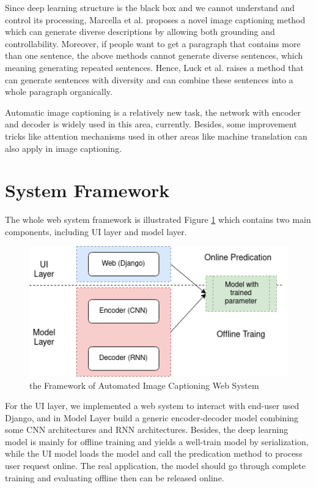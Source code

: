 \documentclass{article}
\begin{document}
Since deep learning structure is the black box and we cannot understand and control its processing, Marcella et al.\cite{cornia2019show} proposes a novel image captioning method which can generate diverse descriptions by allowing both grounding and controllability. Moreover, if people want to get a paragraph that contains more than one sentence, the above methods cannot generate diverse sentences, which meaning generating repeated sentences. Hence, Luck et al.\cite{melas2018training} raises a method that can generate sentences with diversity and can combine these sentences into a whole paragraph organically.

Automatic image captioning is a relatively new task, the network with encoder and decoder is widely used in this area, currently. Besides, some improvement tricks like attention mechanisms used in other areas like machine translation can also apply in image captioning.

\section{System Framework}
The whole web system framework is illustrated Figure \ref{fig1} which contains two main components, including UI layer and model layer.

\begin{figure}[h]
\centering
\includegraphics[width=1\textwidth]{framework.png}
\caption{the Framework of Automated Image Captioning Web System}
\label{fig1}
\end{figure}

For the UI layer, we implemented a web system to interact with end-user used Django, and in Model Layer build a generic encoder-decoder model combining some CNN architectures and RNN architectures. Besides, the deep learning model is mainly for offline training and yields a well-train model by serialization, while the UI model loads the model and call the predication method to process user request online. The real application, the model should go through complete training and evaluating offline then can be released online. 
\end{document}
